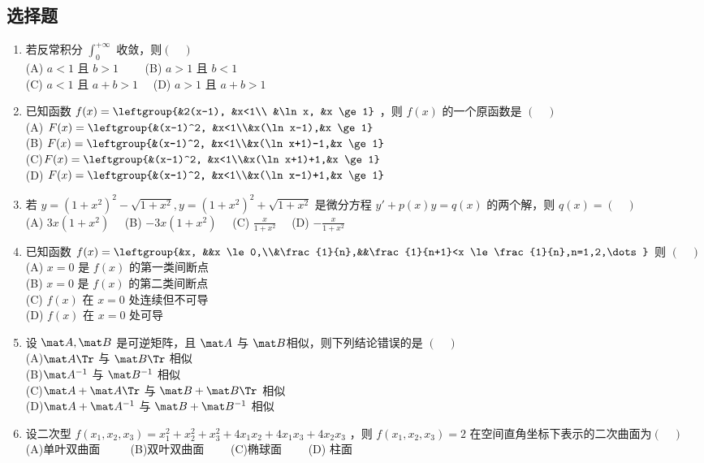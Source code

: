 
\subsection{选择题}

\begin{enumerate}
\item 若反常积分 $\int_{0}^{+\infty}$ 收敛，则$(\quad)$\\
(A) $a<1$ 且 $b>1 \qquad$
(B) $a>1$ 且 $b<1$\\
(C) $a<1$ 且 $a+b>1 \quad$
(D) $a>1$ 且 $a+b>1$
\item 已知函数 $f(x)=\leftgroup{&2(x-1), &x<1\\ &\ln x, &x \ge 1}$ ，则 $f(x)$ 的一个原函数是  $(\quad)$\\
(A) $F(x)=\leftgroup{&(x-1)^2, &x<1\\&x(\ln x-1),&x \ge 1}$\\
(B) $F(x)=\leftgroup{&(x-1)^2, &x<1\\&x(\ln x+1)-1,&x \ge 1}$\\
(C)$F(x)=\leftgroup{&(x-1)^2, &x<1\\&x(\ln x+1)+1,&x \ge 1}$\\
(D) $F(x)=\leftgroup{&(x-1)^2, &x<1\\&x(\ln x-1)+1,&x \ge 1}$\\
\item 若  $y=(1+x^2)^2-\sqrt{1+x^2},y=(1+x^2)^2+\sqrt{1+x^2}$  是微分方程 $y'+p(x)y=q(x)$  的两个解，则 $q(x)= (\quad)$\\
(A) $3x(1+x^2) \quad$
(B) $-3x(1+x^2) \quad$
(C) $\displaystyle \frac{x}{1+x^2} \quad$
(D) $\displaystyle -\frac{x}{1+x^2} \quad$
\item 已知函数 $f(x)=\leftgroup{&x, &&x \le 0,\\&\frac{1}{n},&&\frac{1}{n+1}<x \le \frac{1}{n},n=1,2,\dots}$  则 $(\quad)$\\
(A) $x=0$ 是 $f(x)$  的第一类间断点\\
(B) $x=0$ 是 $f(x)$  的第二类间断点\\
(C) $f(x)$ 在 $x=0$ 处连续但不可导\\
(D) $f(x)$ 在 $x=0$ 处可导
\item  设 $\mat A,\mat B$  是可逆矩阵，且 $\mat A$ 与 $\mat B$相似，则下列结论错误的是 $(\quad)$ \\
(A)$\mat A \Tr$ 与 $\mat B \Tr$ 相似 \\
(B)$\mat A^{-1}$ 与 $\mat B^{-1}$ 相似\\
(C)$\mat A+\mat A \Tr$ 与 $\mat B+\mat B \Tr$ 相似\\
(D)$\mat A +\mat A^{-1}$ 与 $\mat B +\mat B^{-1}$ 相似
\item 设二次型  $f(x_1,x_2,x_3)=x_1^2+x_2^2+x_3^2+4x_1x_2+4x_1x_3+4x_2x_3$  ，则  $f(x_1,x_2,x_3)=2$  在空间直角坐标下表示的二次曲面为$(\quad)$\\
(A)单叶双曲面 $\qquad$
(B)双叶双曲面$\qquad$
(C)椭球面$\qquad$
(D) 柱面


\end{enumerate}
